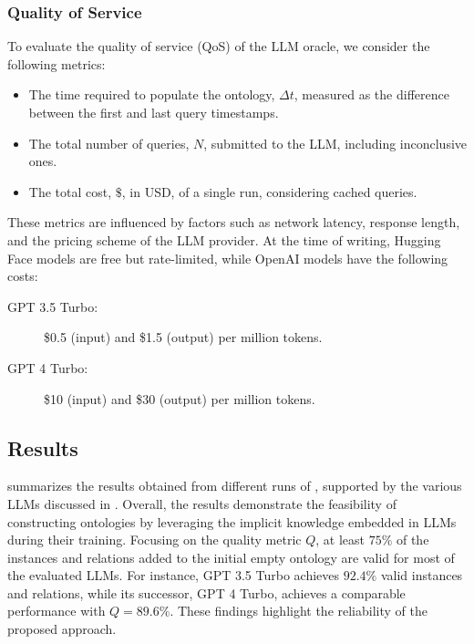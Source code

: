 %
\subsubsection{Quality of Service}

To evaluate the quality of service (QoS) of the \gls{LLM} oracle, we consider the following metrics:

%
\begin{itemize}
    \item The time required to populate the ontology, \(\Delta t\), measured as the difference between the first and last query timestamps.
    \item The total number of queries, \(N\), submitted to the \gls{LLM}, including inconclusive ones.
    \item The total cost, \(\$\), in USD, of a single \llmfkg{} run, considering cached queries.
\end{itemize}

%
These metrics are influenced by factors such as network latency, response length, and the pricing scheme of the \gls{LLM} provider.
%
At the time of writing, Hugging Face models are free but rate-limited, while OpenAI models have the following costs:
%
\begin{description}
    \item[GPT 3.5 Turbo:] \$0.5 (input) and \$1.5 (output) per million tokens.
    \item[GPT 4 Turbo:] \$10 (input) and \$30 (output) per million tokens.
\end{description}
%


\subsection{Results}
\label{subsec:results}
%

%
 summarizes the results obtained from different runs of \llmfkg{}, supported by the various \glspl{LLM} discussed in .
%
Overall, the results demonstrate the feasibility of constructing ontologies by leveraging the implicit knowledge embedded in \glspl{LLM} during their training.
%
Focusing on the quality metric \(Q\), at least \(75\%\) of the instances and relations added to the initial empty ontology are valid for most of the evaluated \glspl{LLM}.
%
For instance, GPT 3.5 Turbo achieves \(92.4\%\) valid instances and relations, while its successor, GPT 4 Turbo, achieves a comparable performance with \(Q = 89.6\%\).
%
These findings highlight the reliability of the proposed approach.

